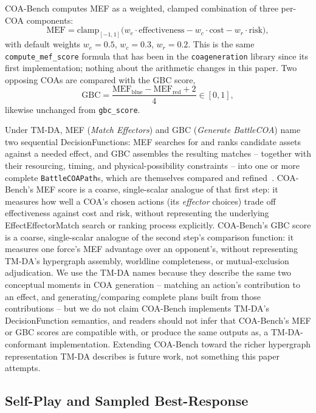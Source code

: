 \documentclass[sigconf]{acmart}
\begin{document}
COA-Bench computes MEF as a weighted, clamped combination of three per-COA components:
\begin{equation}
\mathrm{MEF} = \mathrm{clamp}_{[-1,1]}\big(w_e \cdot \mathrm{effectiveness} - w_c \cdot \mathrm{cost} - w_r \cdot \mathrm{risk}\big),
\end{equation}
with default weights $w_e=0.5$, $w_c=0.3$, $w_r=0.2$. This is the same \texttt{compute\_mef\_score} formula that has been in the \texttt{coageneration} library since its first implementation; nothing about the arithmetic changes in this paper. Two opposing COAs are compared with the GBC score,
\begin{equation}
\mathrm{GBC} = \frac{\mathrm{MEF}_{\mathrm{blue}} - \mathrm{MEF}_{\mathrm{red}} + 2}{4} \in [0,1],
\end{equation}
likewise unchanged from \texttt{gbc\_score}.

Under TM-DA, MEF (\emph{Match Effectors}) and GBC (\emph{Generate BattleCOA}) name two sequential DecisionFunctions: MEF searches for and ranks candidate assets against a needed effect, and GBC assembles the resulting matches -- together with their resourcing, timing, and physical-possibility constraints -- into one or more complete \texttt{BattleCOAPath}s, which are themselves compared and refined~\cite{tmda2025bootcamp}. COA-Bench's MEF score is a coarse, single-scalar analogue of that first step: it measures how well a COA's chosen actions (its \emph{effector} choices) trade off effectiveness against cost and risk, without representing the underlying EffectEffectorMatch search or ranking process explicitly. COA-Bench's GBC score is a coarse, single-scalar analogue of the second step's comparison function: it measures one force's MEF advantage over an opponent's, without representing TM-DA's hypergraph assembly, worldline completeness, or mutual-exclusion adjudication. We use the TM-DA names because they describe the same two conceptual moments in COA generation -- matching an action's contribution to an effect, and generating/comparing complete plans built from those contributions -- but we do not claim COA-Bench implements TM-DA's DecisionFunction semantics, and readers should not infer that COA-Bench's MEF or GBC scores are compatible with, or produce the same outputs as, a TM-DA-conformant implementation. Extending COA-Bench toward the richer hypergraph representation TM-DA describes is future work, not something this paper attempts.

\subsection{Self-Play and Sampled Best-Response}
\end{document}
